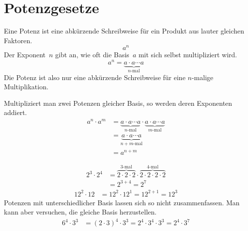 \section{Potenzgesetze}
\label{sec:potenzgesetze}



Eine Potenz ist eine abkürzende Schreibweise für ein Produkt aus lauter gleichen Faktoren.
\begin{equation*}
a^n
\end{equation*}
Der Exponent~\(n\) gibt an, wie oft die Basis~\(a\) mit sich selbst multipliziert wird.
\begin{equation*}
 a^n = \underbrace{a\cdot a \cdots a}_{n\text{-mal}}
\end{equation*}
Die Potenz ist also nur eine abkürzende Schreibweise für eine \(n\)-malige Multiplikation.

\begin{regel}
 Multipliziert man zwei Potenzen gleicher Basis, so werden deren Exponenten addiert.
 \begin{align*}
 a^n \cdot a^m &= \underbrace{a\cdot a \cdots a}_{n\text{-mal}} \cdot \underbrace{a\cdot a \cdots a}_{m\text{-mal}}\\
 &= \underbrace{a\cdot a \cdots a}_{n+m\text{-mal}}\\
 &= a^{n+m}
 \end{align*}
\end{regel}

\begin{bsp}
 \begin{align*}
  2^3\cdot 2^4 &= \overbrace{2\cdot 2\cdot 2}^{3\text{-mal}} \cdot \overbrace{2\cdot 2 \cdot 2 \cdot 2}^{4\text{-mal}}\\
  &= 2^{3+4} = 2^7
 \end{align*}
 \begin{align*}
  12^2 \cdot 12 &= 12^2 \cdot 12^1 = 12^{2+1} = 12^3
 \end{align*}
 Potenzen mit unterschiedlicher Basis lassen sich so nicht zusammenfassen. Man kann aber versuchen, die gleiche Basis herzustellen.
 \begin{align*}
  6^4 \cdot 3^3 &= (2\cdot 3)^4 \cdot 3^3 = 2^4 \cdot 3^4 \cdot 3^3 = 2^4 \cdot 3^7
 \end{align*}

\end{bsp}


